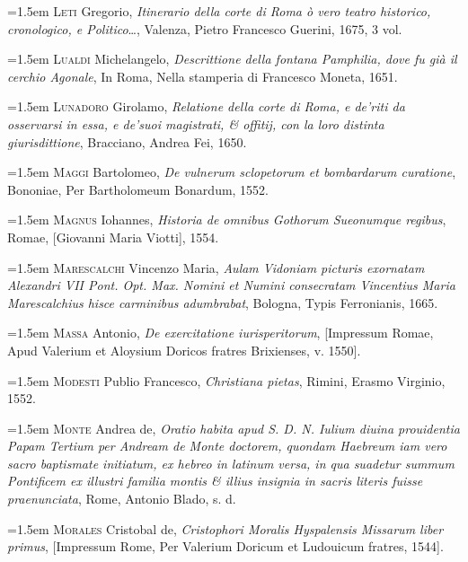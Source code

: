 \documentclass[12pt,twoside,openany]{book}
\newenvironment{PurhBibliography}
  {%
    \par
    \setlength{\parindent}{0pt}%
    \setlength{\leftskip}{0pt}%
  }
  {%
    \par
  }
\begin{document}
\begin{PurhBibliography}
\noindent\hangindent=1.5em \textsc{Leti} Gregorio, \textit{Itinerario della corte di Roma ò vero teatro historico, cronologico, e Politico}…, Valenza, Pietro Francesco Guerini, 1675, 3 vol.\par
\noindent\hangindent=1.5em \textsc{Lualdi} Michelangelo, \textit{Descrittione della fontana Pamphilia, dove fu già il cerchio Agonale}, In Roma, Nella stamperia di Francesco Moneta, 1651.\par
\noindent\hangindent=1.5em \textsc{Lunadoro} Girolamo, \textit{Relatione della corte di Roma, e de’riti da osservarsi in essa, e de’suoi magistrati, \& offitij, con la loro distinta giurisdittione}, Bracciano, Andrea Fei, 1650.\par
\noindent\hangindent=1.5em \textsc{Maggi} Bartolomeo, \textit{De vulnerum sclopetorum et bombardarum curatione}, Bononiae, Per Bartholomeum Bonardum, 1552.\par
\noindent\hangindent=1.5em \textsc{Magnus} Iohannes, \textit{Historia de omnibus Gothorum Sueonumque regibus}, Romae, [Giovanni Maria Viotti], 1554.\par
\noindent\hangindent=1.5em \textsc{Marescalchi} Vincenzo Maria, \textit{Aulam Vidoniam picturis exornatam Alexandri VII Pont. Opt. Max. Nomini et Numini consecratam Vincentius Maria Marescalchius hisce carminibus adumbrabat}, Bologna, Typis Ferronianis, 1665.\par
\noindent\hangindent=1.5em \textsc{Massa} Antonio, \textit{De exercitatione iurisperitorum}, [Impressum Romae, Apud Valerium et Aloysium Doricos fratres Brixienses, v. 1550].\par
\noindent\hangindent=1.5em \textsc{Modesti} Publio Francesco, \textit{Christiana pietas}, Rimini, Erasmo Virginio, 1552.\par
\noindent\hangindent=1.5em \textsc{Monte} Andrea de, \textit{Oratio habita apud S. D. N. Iulium diuina prouidentia Papam Tertium per Andream de Monte doctorem, quondam Haebreum iam vero sacro baptismate initiatum, ex hebreo in latinum versa, in qua suadetur summum Pontificem ex illustri familia montis \& illius insignia in sacris literis fuisse praenunciata}, Rome, Antonio Blado, s. d.\par
\noindent\hangindent=1.5em \textsc{Morales} Cristobal de,\textit{ Cristophori Moralis Hyspalensis Missarum liber primus}, [Impressum Rome, Per Valerium Doricum et Ludouicum fratres, 1544].\par

\end{PurhBibliography}
\end{document}
